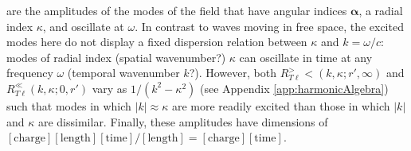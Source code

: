 are the amplitudes of the modes of the field that have angular indices $\bm{\alpha}$, a radial index $\kappa$, and oscillate at $\omega$. In contrast to waves moving in free space, the excited modes here do not display a fixed dispersion relation between $\kappa$ and $k = \omega/c$: modes of radial index (spatial wavenumber?) $\kappa$ can oscillate in time at any frequency $\omega$ (temporal wavenumber $k$?). However, both $R_{T\ell}^><(k,\kappa;r',\infty)$ and $R_{T\ell}^\ll(k,\kappa;0,r')$ vary as $1/(k^2 - \kappa^2)$ (see Appendix \ref{app:harmonicAlgebra}) such that modes in which $|k|\approx\kappa$ are more readily excited than those in which $|k|$ and $\kappa$ are dissimilar. Finally, these amplitudes have dimensions of $[\mathrm{charge}][\mathrm{length}][\mathrm{time}]/[\mathrm{length}] = [\mathrm{charge}][\mathrm{time}]$.

